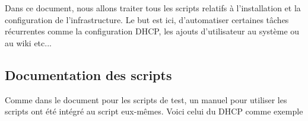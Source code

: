 \documentclass[../livrable-4.tex]{subfiles}
\begin{document}
Dans ce document, nous allons traiter tous les scripts relatifs à l'installation et 
la configuration de l'infrastructure. Le but est ici, d'automatiser certaines tâches récurrentes
comme la configuration DHCP, les ajouts d'utilisateur au système ou au wiki etc... 

\subsection{Documentation des scripts}
Comme dans le document pour les scripts de test, un manuel pour utiliser les scripts
ont été intégré au script eux-mêmes. Voici celui du DHCP comme exemple

\UseRawInputEncoding

\end{document}
